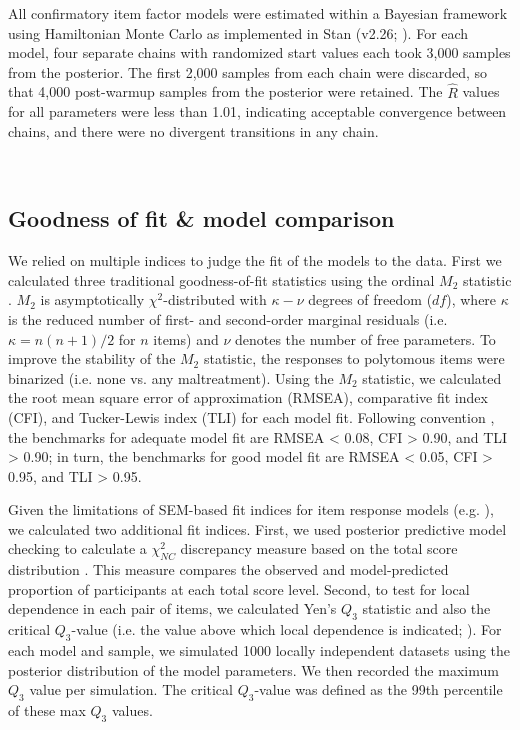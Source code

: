 \documentclass[letterpaper,man,natbib,noextraspace,floatsintext,longtable]{apa6}
\begin{document}
All confirmatory item factor models were estimated within a Bayesian framework using Hamiltonian Monte Carlo as implemented in Stan (v2.26; \citealt{carpenter2017stan}). For each model, four separate chains with randomized start values each took 3,000 samples from the posterior. The first 2,000 samples from each chain were discarded, so that 4,000 post-warmup samples from the posterior were retained. The $\hat{R}$ values for all parameters were less than 1.01, indicating acceptable convergence between chains, and there were no divergent transitions in any chain. 

{\begin{spacing}{0.2} \hfill \\ \end{spacing}} \subsection{Goodness of fit \& model comparison}

We relied on multiple indices to judge the fit of the models to the data. First we calculated three traditional goodness-of-fit statistics using the ordinal $M_2$ statistic \citep{cai2013limited}. $M_2$ is asymptotically $\chi^2$-distributed with $\kappa − \nu$ degrees of freedom ($df$), where $\kappa$ is the reduced number of first- and second-order marginal residuals (i.e. $\kappa = n(n + 1)/2$ for $n$ items) and $\nu$ denotes the number of free parameters. To improve the stability of the $M_2$ statistic, the responses to polytomous items were binarized (i.e. none vs. any maltreatment). Using the $M_2$ statistic, we calculated the root mean square error of approximation (RMSEA), comparative fit index (CFI), and Tucker-Lewis index (TLI) for each model fit. Following convention \citep{hu1999cutoff}, the benchmarks for adequate model fit are RMSEA < 0.08, CFI > 0.90, and TLI > 0.90; in turn, the benchmarks for good model fit are RMSEA < 0.05, CFI > 0.95, and TLI > 0.95. 

Given the limitations of SEM-based fit indices for item response models (e.g. \citealt{reise2014evaluating}), we calculated two additional fit indices. First, we used posterior predictive model checking to calculate a $\chi^2_{NC}$ discrepancy measure based on the total score distribution \citep{sinharay2006posterior}. This measure compares the observed and model-predicted proportion of participants at each total score level. Second, to test for local dependence in each pair of items, we calculated Yen's $Q_3$ statistic \citep{yen1984effects} and also the critical $Q_3$-value (i.e. the value above which local dependence is indicated; \citealt{christensen2017critical}). For each model and sample, we simulated 1000 locally independent datasets using the posterior distribution of the model parameters. We then recorded the maximum $Q_3$ value per simulation. The critical $Q_3$-value was defined as the 99th percentile of these max $Q_3$ values. 
\end{document}
